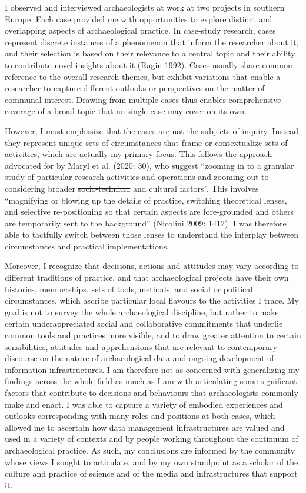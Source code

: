 \documentclass[
]{article}
\makeatletter
\providecommand{\DIFadd}[1]{{\protect\color{blue}\uwave{#1}}} %
\providecommand{\DIFdel}[1]{{\protect\color{red}\sout{#1}}} %
\providecommand{\DIFaddbegin}{} %
\providecommand{\DIFaddend}{} %
\providecommand{\DIFdelbegin}{} %
\providecommand{\DIFdelend}{} %
\newcommand{\DIFscaledelfig}{0.5}
\newlength{\DIFdelgraphicswidth} %
\newlength{\DIFdelgraphicsheight} %
\newcommand{\DIFaddincludegraphics}[2][]{{\color{blue}\fbox{\DIFOincludegraphics[#1]{#2}}}} %
\newcommand{\DIFdelincludegraphics}[2][]{%
\sbox{\DIFdelgraphicsbox}{\DIFOincludegraphics[#1]{#2}}%
\settoboxwidth{\DIFdelgraphicswidth}{\DIFdelgraphicsbox} %
\settoboxtotalheight{\DIFdelgraphicsheight}{\DIFdelgraphicsbox} %
\scalebox{\DIFscaledelfig}{%
\parbox[b]{\DIFdelgraphicswidth}{\usebox{\DIFdelgraphicsbox}\\[-\baselineskip] \rule{\DIFdelgraphicswidth}{0em}}\llap{\resizebox{\DIFdelgraphicswidth}{\DIFdelgraphicsheight}{%
\setlength{\unitlength}{\DIFdelgraphicswidth}%
\begin{picture}(1,1)%
\thicklines\linethickness{2pt} %
{\color[rgb]{1,0,0}\put(0,0){\framebox(1,1){}}}%
{\color[rgb]{1,0,0}\put(0,0){\line( 1,1){1}}}%
{\color[rgb]{1,0,0}\put(0,1){\line(1,-1){1}}}%
\end{picture}%
}\hspace*{3pt}}} %
} %
\DeclareRobustCommand{\DIFaddbegin}{\DIFOaddbegin \let\includegraphics\DIFaddincludegraphics} %
\DeclareRobustCommand{\DIFaddend}{\DIFOaddend \let\includegraphics\DIFOincludegraphics} %
\DeclareRobustCommand{\DIFdelbegin}{\DIFOdelbegin \let\includegraphics\DIFdelincludegraphics} %
\DeclareRobustCommand{\DIFdelend}{\DIFOaddend \let\includegraphics\DIFOincludegraphics} %
\let\sout@orig\sout %
\renewcommand{\sout}[1]{\ifmmode\text{\sout@orig{\ensuremath{#1}}}\else\sout@orig{#1}\fi} %
\makeatother
\begin{document}
I observed and interviewed archaeologists at work at two projects in
southern Europe. Each case provided me with opportunities to explore
distinct and overlapping aspects of archaeological practice. In
case-study research, cases represent discrete instances of a phenomenon
that inform the researcher about it, and their selection is based on
their relevance to a central topic and their ability to contribute novel
insights about it (Ragin 1992). Cases usually share common reference to
the overall research themes, but exhibit variations that enable a
researcher to capture different outlooks or perspectives on the matter
of communal interest. Drawing from multiple cases thus enables
comprehensive coverage of a broad topic that no single case may cover on
its own.

However, I must emphasize that the cases are not the subjects of
inquiry. Instead, they represent unique sets of circumstances that frame
or contextualize sets of activities, which are actually my primary
focus. This follows the approach advocated for by Maryl et al. (2020:
30), who suggest ``zooming in to a granular study of particular research
activities and operations and zooming out to considering broader
\DIFdelbegin \DIFdel{socio-technical }\DIFdelend \DIFaddbegin \DIFadd{sociotechnical }\DIFaddend and cultural factors''. This involves ``magnifying or
blowing up the details of practice, switching theoretical lenses, and
selective re-positioning so that certain aspects are fore-grounded and
others are temporarily sent to the background'' (Nicolini 2009: 1412). I
was therefore able to tactfully switch between those lenses to
understand the interplay between circumstances and practical
implementations.

Moreover, I recognize that decisions, actions and attitudes may vary
according to different traditions of practice, and that archaeological
projects have their own histories, memberships, sets of tools, methods,
and social or political circumstances, which ascribe particular local
flavours to the activities I trace. My goal is not to survey the whole
archaeological discipline, but rather to make certain underappreciated
social and collaborative commitments that underlie common tools and
practices more visible, and to draw greater attention to certain
sensibilities, attitudes and apprehensions that are relevant to
contemporary discourse on the nature of archaeological data and ongoing
development of information infrastructures. I am therefore not as
concerned with generalizing my findings across the whole field as much
as I am with articulating some significant factors that contribute to
decisions and behaviours that archaeologists commonly make and enact. I
was able to capture a variety of embodied experiences and outlooks
corresponding with many roles and positions at both cases, which allowed
me to ascertain how data management infrastructures are valued and used
in a variety of contexts and by people working throughout the continuum
of archaeological practice. As such, my conclusions are informed by the
community whose views I sought to articulate, and by my own standpoint
as a scholar of the culture and practice of science and of the media and
infrastructures that support it.
\end{document}
